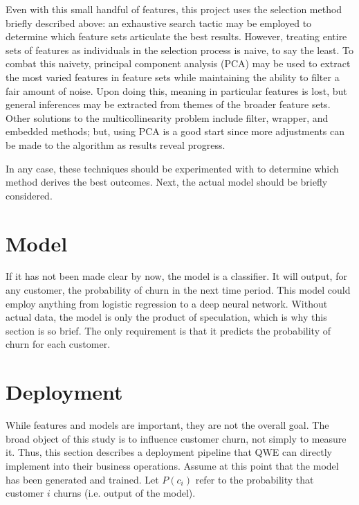 \documentclass{article}
\begin{document}
	Even with this small handful of features, this project uses the selection method briefly described above: an exhaustive search tactic may be employed to determine which feature sets articulate the best results. However, treating entire sets of features as individuals in the selection process is naive, to say the least. To combat this naivety, principal component analysis (PCA) may be used to extract the most varied features in feature sets while maintaining the ability to filter a fair amount of noise. Upon doing this, meaning in particular features is lost, but general inferences may be extracted from themes of the broader feature sets. Other solutions to the multicollinearity problem include filter, wrapper, and embedded methods; but, using PCA is a good start since more adjustments can be made to the algorithm as results reveal progress. 
	
	In any case, these techniques should be experimented with to determine which method derives the best outcomes. Next, the actual model should be briefly considered.
		
	\section{Model}
	
	If it has not been made clear by now, the model is a classifier. It will output, for any customer, the probability of churn in the next time period. This model could employ anything from logistic regression to a deep neural network. Without actual data, the model is only the product of speculation, which is why this section is so brief. The only requirement is that it predicts the probability of churn for each customer.
	
	\section{Deployment}
	
	While features and models are important, they are not the overall goal. The broad object of this study is to influence customer churn, not simply to measure it. Thus, this section describes a deployment pipeline that QWE can directly implement into their business operations. Assume at this point that the model has been generated and trained. Let $P(c_i)$ refer to the probability that customer $i$ churns (i.e. output of the model). 
	
\end{document}
